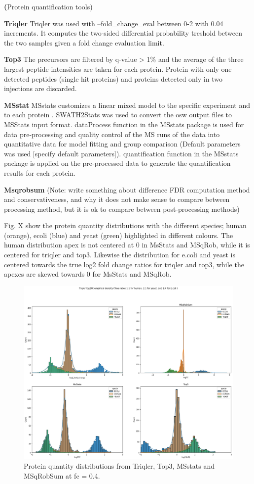 \documentclass[10pt,letterpaper]{article}
\begin{document}
\textbf(Protein quantification tools)

\textbf{Triqler}
Triqler was used with --fold\_change\_eval between 0-2 with 0.04 increments. It computes the two-sided differential probability treshold between the two samples given a fold change evaluation limit. 

\textbf{Top3}
The precursors are filtered by q-value > 1\% and the average of the three largest peptide intensities are taken for each protein. Protein with only one detected peptides (single hit proteins) and proteins detected only in two injections are discarded.

\textbf{MSstat}
 MSstats customizes a linear mixed model to the specific experiment and to each protein . SWATH2Stats was used to convert the osw output files to MSStats input format. dataProcess function in the MSstats package is used for data pre-processing and quality control of the MS runs of the data into quantitative data for model fitting and group comparison (Default parameters was used [specify default parameters]). quantification function in the MSstats package is applied on the pre-processed data to generate the quantification results for each protein.

\textbf{Msqrobsum}
(Note: write something about difference FDR computation method and conservativeness, and why it does not make sense to compare between processing method, but it is ok to compare between post-processing methods)

Fig. X show the protein quantity distributions with the different species; human (orange), ecoli (blue) and yeast (green) highlighted in different colours. The human distribution apex is not centered at 0 in MsStats and MSqRob, while it is centered for triqler and top3. Likewise the distribution for e.coli and yeast is centered towards the true log2 fold change ratios for triqler and top3, while the apexes are skewed towards 0 for MsStats and MSqRob.    

\begin{figure}[htp]
    \centering
    \includegraphics[width=12cm]{../../result/2021-08-13_docs_plots/intensity_plot.png}
    \caption{Protein quantity distributions from Triqler, Top3, MSstats and MSqRobSum at fc = 0.4.}
    \label{fig:intensity_distribution}
\end{figure}
\end{document}
